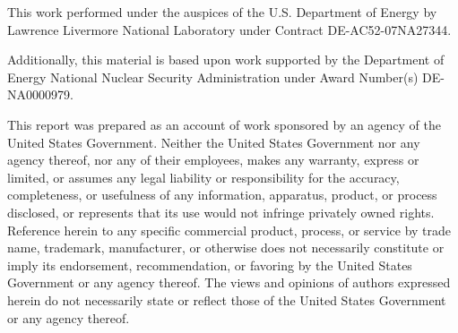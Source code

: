 This work performed under the auspices of the U.S. Department of Energy by
Lawrence Livermore National Laboratory under Contract DE-AC52-07NA27344.

Additionally, this material is based upon work supported by the Department of 
Energy National Nuclear Security Administration under Award Number(s) 
DE-NA0000979. %

This report was prepared as an account of work sponsored by an agency of the 
United States Government. Neither the United States Government nor any agency 
thereof, nor any of their employees, makes any warranty, express or limited, or 
assumes any legal liability or responsibility for the accuracy, completeness, 
or usefulness of any information, apparatus, product, or process disclosed, or 
represents that its use would not infringe privately owned rights. Reference 
herein to any specific commercial product, process, or service by trade name, 
trademark, manufacturer, or otherwise does not necessarily constitute or imply 
its endorsement, recommendation, or favoring by the United States Government or 
any agency thereof. The views and opinions of authors expressed herein do not 
necessarily state or reflect those of the United States Government or any 
agency thereof.
